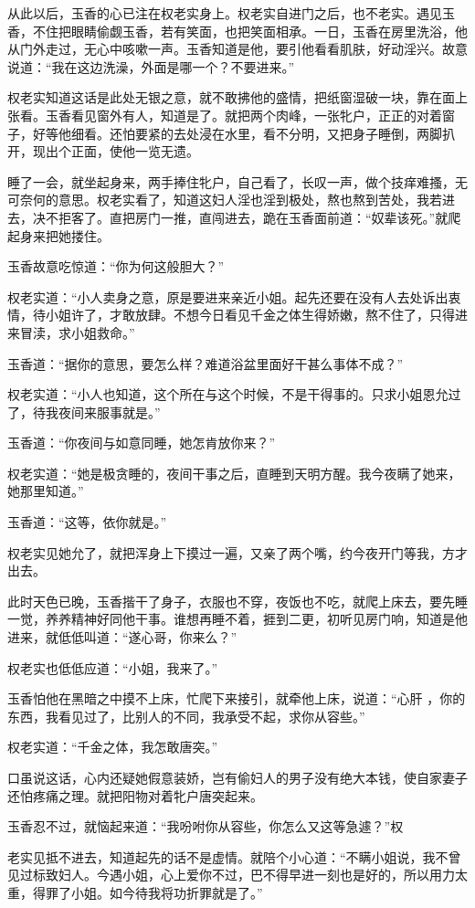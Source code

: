 \documentclass[a4paper,12pt,UTF8,twoside]{ctexbook}
\begin{document}
从此以后，玉香的心已注在权老实身上。权老实自进门之后，也不老实。遇见玉香，不住把眼睛偷觑玉香，若有笑面，也把笑面相承。一日，玉香在房里洗浴，他从门外走过，无心中咳嗽一声。玉香知道是他，要引他看看肌肤，好动淫兴。故意说道：“我在这边洗澡，外面是哪一个？不要进来。”

权老实知道这话是此处无银之意，就不敢拂他的盛情，把纸窗湿破一块，靠在面上张看。玉香看见窗外有人，知道是了。就把两个肉峰，一张牝户，正正的对着窗子，好等他细看。还怕要紧的去处浸在水里，看不分明，又把身子睡倒，两脚扒开，现出个正面，使他一览无遗。

睡了一会，就坐起身来，两手捧住牝户，自己看了，长叹一声，做个技痒难搔，无可奈何的意思。权老实看了，知道这妇人淫也淫到极处，熬也熬到苦处，我若进去，决不拒客了。直把房门一推，直闯进去，跪在玉香面前道：“奴辈该死。”就爬起身来把她搂住。

玉香故意吃惊道：“你为何这般胆大？”

权老实道：“小人卖身之意，原是要进来亲近小姐。起先还要在没有人去处诉出衷情，待小姐许了，才敢放肆。不想今日看见千金之体生得娇嫩，熬不住了，只得进来冒渎，求小姐救命。”

玉香道：“据你的意思，要怎么样？难道浴盆里面好干甚么事体不成？”

权老实道：“小人也知道，这个所在与这个时候，不是干得事的。只求小姐恩允过了，待我夜间来服事就是。”

玉香道：“你夜间与如意同睡，她怎肯放你来？”

权老实道：“她是极贪睡的，夜间干事之后，直睡到天明方醒。我今夜瞒了她来，她那里知道。”

玉香道：“这等，依你就是。”

权老实见她允了，就把浑身上下摸过一遍，又亲了两个嘴，约今夜开门等我，方才出去。

此时天色已晚，玉香揩干了身子，衣服也不穿，夜饭也不吃，就爬上床去，要先睡一觉，养养精神好同他干事。谁想再睡不着，捱到二更，初听见房门响，知道是他进来，就低低叫道：“遂心哥，你来么？”

权老实也低低应道：“小姐，我来了。”

玉香怕他在黑暗之中摸不上床，忙爬下来接引，就牵他上床，说道：“心肝 ，你的东西，我看见过了，比别人的不同，我承受不起，求你从容些。”

权老实道：“千金之体，我怎敢唐突。”

口虽说这话，心内还疑她假意装娇，岂有偷妇人的男子没有绝大本钱，使自家妻子还怕疼痛之理。就把阳物对着牝户唐突起来。

玉香忍不过，就恼起来道：“我吩咐你从容些，你怎么又这等急遽？”权

老实见抵不进去，知道起先的话不是虚情。就陪个小心道：“不瞒小姐说，我不曾见过标致妇人。今遇小姐，心上爱你不过，巴不得早进一刻也是好的，所以用力太重，得罪了小姐。如今待我将功折罪就是了。”
\end{document}
